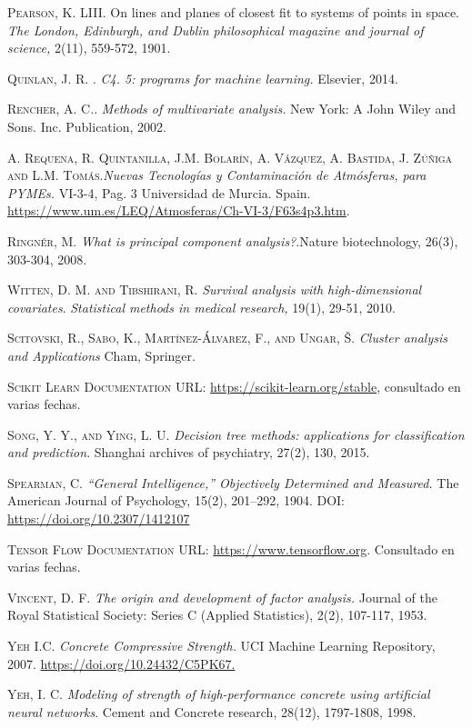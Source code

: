 \begin{thebibliography}{99}
 \textsc{Pearson, K}. LIII. On lines and planes of closest fit to systems of points in space. \emph{The London, Edinburgh, and Dublin philosophical magazine and journal of science,} 2(11), 559-572, 1901.

\textsc{Quinlan, J. R. }. \emph{C4. 5: programs for machine learning.} Elsevier, 2014.

 \textsc{Rencher, A. C.}. \emph{Methods of multivariate analysis.} New York: A John Wiley and Sons. Inc. Publication, 2002.

\textsc{A. Requena, R. Quintanilla, J.M. Bolarín, A. Vázquez, A. Bastida, J. Zúñiga and L.M. Tomás.}\emph{Nuevas Tecnologías y Contaminación de Atmósferas, para PYMEs.} VI-3-4, Pag. 3 Universidad de Murcia. Spain. \url{https://www.um.es/LEQ/Atmosferas/Ch-VI-3/F63s4p3.htm}.

\textsc{Ringnér, M. }\emph{What is principal component analysis?}.Nature biotechnology, 26(3), 303-304, 2008.

\textsc{Witten, D. M. and Tibshirani, R. } \emph{Survival analysis with high-dimensional covariates}. \emph{Statistical methods in medical research,} 19(1), 29-51, 2010.

\textsc{Scitovski, R., Sabo, K., Martínez-Álvarez, F., and Ungar, Š. } \emph{Cluster analysis and Applications} Cham, Springer.

 \textsc{Scikit Learn Documentation} URL: \url{https://scikit-learn.org/stable}, consultado en varias fechas. 

\textsc{Song, Y. Y., and Ying, L. U. } \emph{Decision tree methods: applications for classification and prediction}. Shanghai archives of psychiatry, 27(2), 130, 2015.

\textsc{Spearman, C.} \emph{“General Intelligence,” Objectively Determined and Measured.} The American Journal of Psychology, 15(2), 201–292, 1904. DOI: \url{https://doi.org/10.2307/1412107}

\textsc{Tensor Flow Documentation} URL: \url{https://www.tensorflow.org}. Consultado en varias fechas.

\textsc{Vincent, D. F.} \emph{The origin and development of factor analysis.} Journal of the Royal Statistical Society: Series C (Applied Statistics), 2(2), 107-117, 1953.



\textsc{Yeh I.C.} \emph{Concrete Compressive Strength.} UCI Machine Learning Repository, 2007. \url{https://doi.org/10.24432/C5PK67.}

\textsc{Yeh, I. C.} \emph{ Modeling of strength of high-performance concrete using artificial neural networks}. Cement and Concrete research, 28(12), 1797-1808, 1998.

\end{thebibliography}
 